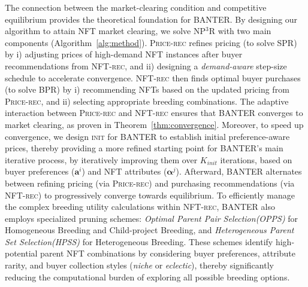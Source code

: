 \documentclass[conference]{IEEEtran}
\theoremstyle{plain}
\begin{document}
    The connection between the market-clearing condition and competitive equilibrium provides the theoretical foundation for BANTER\xspace. By designing our algorithm to attain NFT market clearing, we solve NP$^3$R\xspace with two main components (Algorithm~\ref{alg:method}). \textsc{Price-rec}\xspace refines pricing (to solve SPR\xspace) by i) adjusting prices of high-demand NFT instances after buyer recommendations from \textsc{NFT-rec}\xspace, and ii) designing a \emph{demand-aware} step-size schedule to accelerate convergence. \textsc{NFT-rec}\xspace then finds optimal buyer purchases (to solve BPR\xspace) by i) recommending NFTs based on the updated pricing from \textsc{Price-rec}\xspace, and ii) selecting appropriate breeding combinations. The adaptive interaction between \textsc{Price-rec}\xspace and \textsc{NFT-rec}\xspace ensures that BANTER\xspace converges to market clearing, as proven in Theorem~\ref{thm:convergence}. Moreover, to speed up convergence, we design \textsc{init} for BANTER\xspace to establish initial preference-aware prices, thereby providing a more refined starting point for BANTER\xspace's main iterative process, by iteratively improving them over $K_{init}$ iterations, based on buyer preferences ($\mathbf{a}^i$) and NFT attributes ($\bm{\alpha}^j$). Afterward, BANTER\xspace alternates between refining pricing (via \textsc{Price-rec}\xspace) and purchasing recommendations (via \textsc{NFT-rec}\xspace) to progressively converge towards equilibrium. To efficiently manage the complex breeding utility calculations within \textsc{NFT-rec}\xspace, BANTER\xspace also employs specialized pruning schemes: \emph{Optimal Parent Pair Selection\xspace (OPPS\xspace)} for Homogeneous Breeding\xspace and Child-project Breeding\xspace, and \emph{Heterogeneous Parent Set Selection\xspace (HPSS\xspace)} for Heterogeneous Breeding\xspace. These schemes identify high-potential parent NFT combinations by considering buyer preferences, attribute rarity, and buyer collection styles (\textit{niche} or \textit{eclectic}), thereby significantly reducing the computational burden of exploring all possible breeding options.
\end{document}
